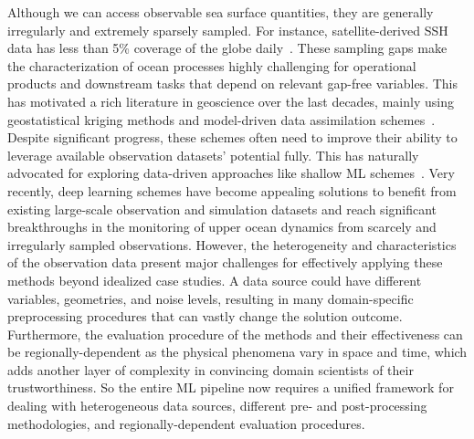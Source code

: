 Although we can access observable sea surface quantities, they are generally irregularly and extremely sparsely sampled. 
For instance, satellite-derived SSH data has less than 5\% coverage of the globe daily~\cite{DUACS}. 
These sampling gaps make the characterization of ocean processes highly challenging for operational products and downstream tasks that depend on relevant gap-free variables. This has motivated a rich literature in geoscience over the last decades, mainly using geostatistical kriging methods \cite{DUACS, MIOST} and model-driven data assimilation schemes~\cite{BFNQG, GLORYS12}. Despite significant progress, these schemes often need to improve their ability to leverage available observation datasets' potential fully. 
This has naturally advocated for exploring data-driven approaches like shallow ML schemes~\cite{DINEOF, DINEOF2, ANALOGDA2, ANALOGDA}. Very recently, deep learning schemes \cite{SSHInterpAttention, SSHInterpConvLSTM, SSHInterpUNet} have become appealing solutions to benefit from existing large-scale observation and simulation datasets and reach significant breakthroughs in the monitoring of upper ocean dynamics from scarcely and irregularly sampled observations. However, the heterogeneity and characteristics of the observation data present major challenges for effectively applying these methods beyond idealized case studies. 
A data source could have different variables, geometries, and noise levels, resulting in many domain-specific preprocessing procedures that can vastly change the solution outcome.
Furthermore, the evaluation procedure of the methods and their effectiveness can be regionally-dependent as the physical phenomena vary in space and time, which adds another layer of complexity in convincing domain scientists of their trustworthiness.
So the entire ML pipeline now requires a unified framework for dealing with heterogeneous data sources, different pre- and post-processing methodologies, and regionally-dependent evaluation procedures.


